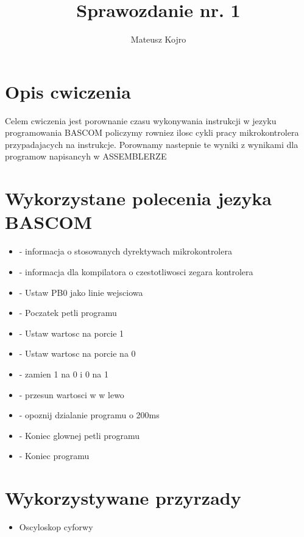 \documentclass{article}
\title{Sprawozdanie nr. 1}
\author{Mateusz Kojro}
\date{}
\begin{document}
\maketitle

\section{Opis cwiczenia}
  Celem cwiczenia jest porownanie czasu wykonywania instrukcji w jezyku programowania BASCOM
  policzymy rowniez ilosc cykli pracy mikrokontrolera przypadajacych na instrukcje.
  Porownamy nastepnie te wyniki z wynikami dla programow napisancyh w ASSEMBLERZE 



\section{Wykorzystane polecenia jezyka BASCOM}

\begin{itemize}
\item {} - informacja o stosowanych dyrektywach mikrokontrolera
\item {} - informacja dla kompilatora o czestotliwosci zegara kontrolera 
\item {} - Ustaw PB0 jako linie wejsciowa
\item {} - Poczatek petli programu
\item {} - Ustaw wartosc na porcie 1
\item {} - Ustaw wartosc na porcie na 0
\item {} - zamien 1 na 0 i 0 na 1
\item {} - przesun wartosci w  w lewo
\item {} - opoznij dzialanie programu o 200ms
\item {} - Koniec glownej petli programu
\item {} - Koniec programu 
\end{itemize}

\section{Wykorzystywane przyrzady}
\begin{itemize}
  \item Oscyloskop cyforwy
\end{itemize}
\end{document}
